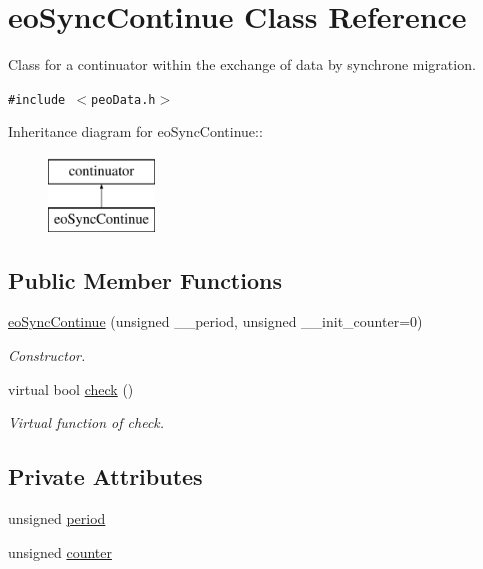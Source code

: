 \hypertarget{classeoSyncContinue}{
\section{eo\-Sync\-Continue Class Reference}
\label{classeoSyncContinue}
}
Class for a continuator within the exchange of data by synchrone migration.  


{\tt \#include $<$peo\-Data.h$>$}

Inheritance diagram for eo\-Sync\-Continue::\begin{figure}[H]
\begin{center}
\leavevmode
\includegraphics[height=2cm]{classeoSyncContinue}
\end{center}
\end{figure}
\subsection*{Public Member Functions}
\begin{CompactItemize}
\item 
\hyperlink{classeoSyncContinue_a1f0cb0e380ffffd964031c4aa0f7086}{eo\-Sync\-Continue} (unsigned \_\-\_\-period, unsigned \_\-\_\-init\_\-counter=0)
\begin{CompactList}\small\item\em Constructor. \item\end{CompactList}\item 
virtual bool \hyperlink{classeoSyncContinue_417078233f768debb14b5a90f6412b3c}{check} ()
\begin{CompactList}\small\item\em Virtual function of check. \item\end{CompactList}\end{CompactItemize}
\subsection*{Private Attributes}
\begin{CompactItemize}
\item 
unsigned \hyperlink{classeoSyncContinue_966a94a44db2f84c7df0ef3d4694e37c}{period}
\item 
\hypertarget{classeoSyncContinue_c2e6e2b929884e370b16f2cccda9cd17}{
unsigned \hyperlink{classeoSyncContinue_c2e6e2b929884e370b16f2cccda9cd17}{counter}}
\label{classeoSyncContinue_c2e6e2b929884e370b16f2cccda9cd17}

\end{CompactItemize}



